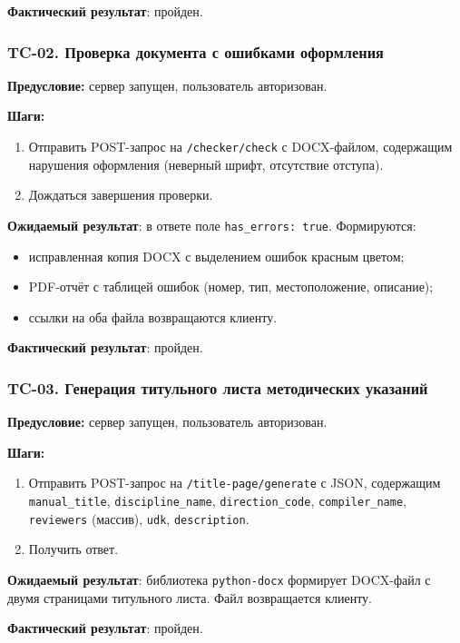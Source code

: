 \textbf{Фактический результат}: пройден.

\subsubsection{TC-02. Проверка документа с ошибками оформления}

\textbf{Предусловие:} сервер запущен, пользователь авторизован.

\textbf{Шаги:}
\begin{enumerate}
	\item Отправить POST-запрос на \texttt{/checker/check} с DOCX-файлом, содержащим нарушения оформления (неверный шрифт, отсутствие отступа).
	\item Дождаться завершения проверки.
\end{enumerate}

\textbf{Ожидаемый результат}: в ответе поле \texttt{has\_errors: true}. Формируются:
\begin{itemize}
	\item исправленная копия DOCX с выделением ошибок красным цветом;
	\item PDF-отчёт с таблицей ошибок (номер, тип, местоположение, описание);
	\item ссылки на оба файла возвращаются клиенту.
\end{itemize}

\textbf{Фактический результат}: пройден.

\subsubsection{TC-03. Генерация титульного листа методических указаний}

\textbf{Предусловие:} сервер запущен, пользователь авторизован.

\textbf{Шаги:}
\begin{enumerate}
	\item Отправить POST-запрос на \texttt{/title-page/generate} с JSON, содержащим \texttt{manual\_title}, \texttt{discipline\_name}, \texttt{direction\_code}, \texttt{compiler\_name}, \texttt{reviewers} (массив), \texttt{udk}, \texttt{description}.
	\item Получить ответ.
\end{enumerate}

\textbf{Ожидаемый результат}: библиотека \texttt{python-docx} формирует DOCX-файл с двумя страницами титульного листа. Файл возвращается клиенту.

\textbf{Фактический результат}: пройден.

